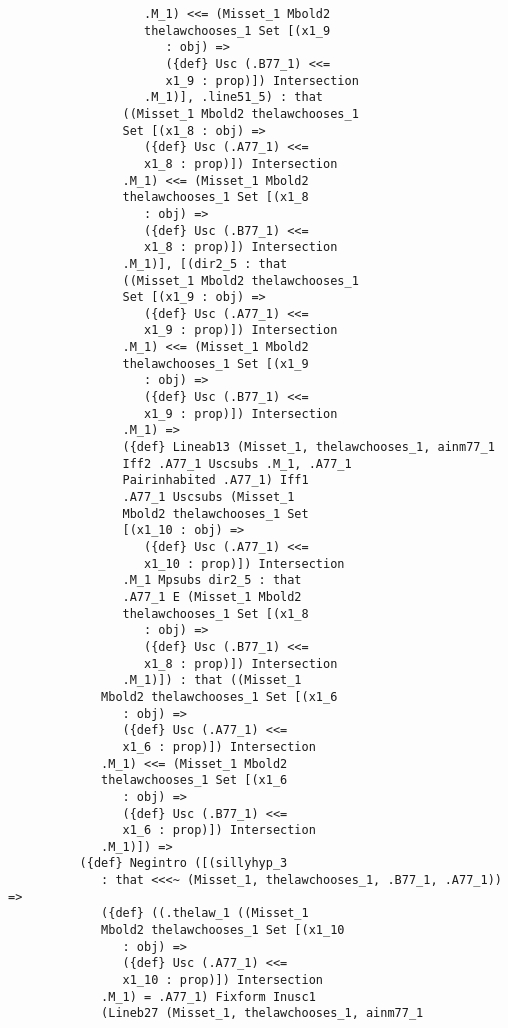 \documentclass[12pt]{article}
\begin{document}
\begin{verbatim}
                   .M_1) <<= (Misset_1 Mbold2 
                   thelawchooses_1 Set [(x1_9 
                      : obj) => 
                      ({def} Usc (.B77_1) <<= 
                      x1_9 : prop)]) Intersection 
                   .M_1)], .line51_5) : that 
                ((Misset_1 Mbold2 thelawchooses_1 
                Set [(x1_8 : obj) => 
                   ({def} Usc (.A77_1) <<= 
                   x1_8 : prop)]) Intersection 
                .M_1) <<= (Misset_1 Mbold2 
                thelawchooses_1 Set [(x1_8 
                   : obj) => 
                   ({def} Usc (.B77_1) <<= 
                   x1_8 : prop)]) Intersection 
                .M_1)], [(dir2_5 : that 
                ((Misset_1 Mbold2 thelawchooses_1 
                Set [(x1_9 : obj) => 
                   ({def} Usc (.A77_1) <<= 
                   x1_9 : prop)]) Intersection 
                .M_1) <<= (Misset_1 Mbold2 
                thelawchooses_1 Set [(x1_9 
                   : obj) => 
                   ({def} Usc (.B77_1) <<= 
                   x1_9 : prop)]) Intersection 
                .M_1) => 
                ({def} Lineab13 (Misset_1, thelawchooses_1, ainm77_1 
                Iff2 .A77_1 Uscsubs .M_1, .A77_1 
                Pairinhabited .A77_1) Iff1 
                .A77_1 Uscsubs (Misset_1 
                Mbold2 thelawchooses_1 Set 
                [(x1_10 : obj) => 
                   ({def} Usc (.A77_1) <<= 
                   x1_10 : prop)]) Intersection 
                .M_1 Mpsubs dir2_5 : that 
                .A77_1 E (Misset_1 Mbold2 
                thelawchooses_1 Set [(x1_8 
                   : obj) => 
                   ({def} Usc (.B77_1) <<= 
                   x1_8 : prop)]) Intersection 
                .M_1)]) : that ((Misset_1 
             Mbold2 thelawchooses_1 Set [(x1_6 
                : obj) => 
                ({def} Usc (.A77_1) <<= 
                x1_6 : prop)]) Intersection 
             .M_1) <<= (Misset_1 Mbold2 
             thelawchooses_1 Set [(x1_6 
                : obj) => 
                ({def} Usc (.B77_1) <<= 
                x1_6 : prop)]) Intersection 
             .M_1)]) => 
          ({def} Negintro ([(sillyhyp_3 
             : that <<<~ (Misset_1, thelawchooses_1, .B77_1, .A77_1)) => 
             ({def} ((.thelaw_1 ((Misset_1 
             Mbold2 thelawchooses_1 Set [(x1_10 
                : obj) => 
                ({def} Usc (.A77_1) <<= 
                x1_10 : prop)]) Intersection 
             .M_1) = .A77_1) Fixform Inusc1 
             (Lineb27 (Misset_1, thelawchooses_1, ainm77_1 

\end{verbatim}
\end{document}
